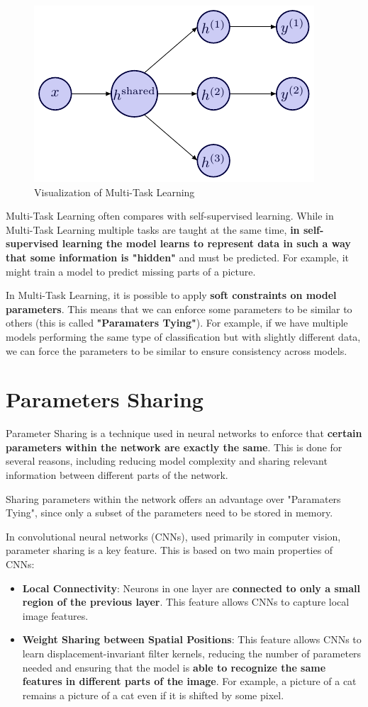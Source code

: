 \begin{figure}[!htbp]
    \centering
    \includegraphics[width = 0.6\linewidth]{tikz/chapter4 - Multi Task Learning.pdf} 
    \caption{Visualization of Multi-Task Learning}
\end{figure}

Multi-Task Learning often compares with self-supervised learning. While in Multi-Task Learning multiple tasks are taught at the same time, \textbf{in self-supervised learning the model learns to represent data in such a way that some information is "hidden"} and must be predicted. For example, it might train a model to predict missing parts of a picture.

In Multi-Task Learning, it is possible to apply \textbf{soft constraints on model parameters}. This means that we can enforce some parameters to be similar to others (this is called \textbf{"Paramaters Tying"}). For example, if we have multiple models performing the same type of classification but with slightly different data, we can force the parameters to be similar to ensure consistency across models.

\section{Parameters Sharing}
\label{c4:parameterSharing}
Parameter Sharing is a technique used in neural networks to enforce that \textbf{certain parameters within the network are exactly the same}. This is done for several reasons, including reducing model complexity and sharing relevant information between different parts of the network.

Sharing parameters within the network offers an advantage over "Paramaters Tying", since only a subset of the parameters need to be stored in memory.

In convolutional neural networks (CNNs), used primarily in computer vision, parameter sharing is a key feature. This is based on two main properties of CNNs:

\begin{itemize}
    \item \textbf{Local Connectivity}: Neurons in one layer are \textbf{connected to only a small region of the previous layer}. This feature allows CNNs to capture local image features.
    \item \textbf{Weight Sharing between Spatial Positions}: This feature allows CNNs to learn displacement-invariant filter kernels, reducing the number of parameters needed and ensuring that the model is \textbf{able to recognize the same features in different parts of the image}. For example, a picture of a cat remains a picture of a cat even if it is shifted by some pixel. 
\end{itemize}

